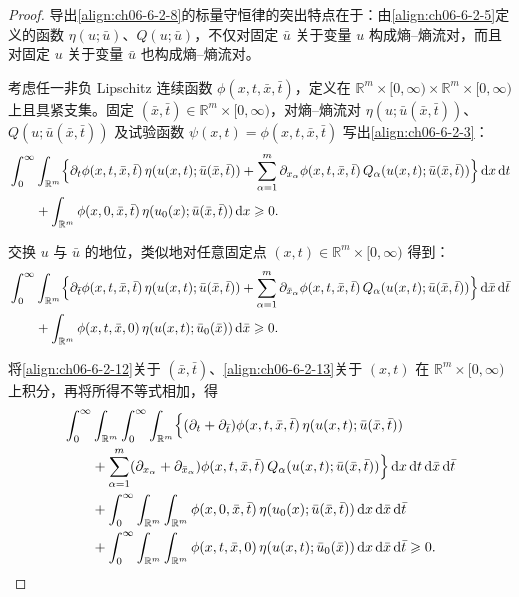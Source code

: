 \documentclass[../../main.tex]{subfiles}
\begin{document}
\begin{proof}
导出\eqref{align:ch06-6-2-8}的标量守恒律的突出特点在于：由\eqref{align:ch06-6-2-5}定义的函数 $\eta(u;\bar{u})$、$Q(u;\bar{u})$，不仅对固定 $\bar{u}$ 关于变量 $u$ 构成熵--熵流对，而且对固定 $u$ 关于变量 $\bar{u}$ 也构成熵--熵流对。

考虑任一非负 Lipschitz 连续函数 $\phi(x,t,\bar{x},\bar{t})$，定义在 $\mathbb{R}^{m}\times[0,\infty)\times\mathbb{R}^{m}\times[0,\infty)$ 上且具紧支集。固定 $(\bar{x},\bar{t})\in\mathbb{R}^{m}\times[0,\infty)$，对熵--熵流对 $\eta(u;\bar{u}(\bar{x},\bar{t}))$、$Q(u;\bar{u}(\bar{x},\bar{t}))$ 及试验函数 $\psi(x,t)=\phi(x,t,\bar{x},\bar{t})$ 写出\eqref{align:ch06-6-2-3}：
\begin{align}
&\int_{0}^{\infty}\int_{\mathbb{R}^{m}}\Bigl{\{}\partial_{t}\phi(x,t,\bar{x},\bar{t})\,\eta(u(x,t);\bar{u}(\bar{x},\bar{t}))+\sum_{\alpha=1}^{m}\partial_{x_{\alpha}}\phi(x,t,\bar{x},\bar{t})\,Q_{\alpha}(u(x,t);\bar{u}(\bar{x},\bar{t}))\Bigr{\}}\,\mathrm{d}x\,\mathrm{d}t\notag\\
&\qquad+\int_{\mathbb{R}^{m}}\phi(x,0,\bar{x},\bar{t})\,\eta(u_{0}(x);\bar{u}(\bar{x},\bar{t}))\,\mathrm{d}x\geqslant 0.
\label{align:ch06-6-2-12}
\end{align}

交换 $u$ 与 $\bar{u}$ 的地位，类似地对任意固定点 $(x,t)\in\mathbb{R}^{m}\times[0,\infty)$ 得到：
\begin{align}
&\int_{0}^{\infty}\int_{\mathbb{R}^{m}}\Bigl{\{}\partial_{\bar{t}}\phi(x,t,\bar{x},\bar{t})\,\eta(u(x,t);\bar{u}(\bar{x},\bar{t}))+\sum_{\alpha=1}^{m}\partial_{\bar{x}_{\alpha}}\phi(x,t,\bar{x},\bar{t})\,Q_{\alpha}(u(x,t);\bar{u}(\bar{x},\bar{t}))\Bigr{\}}\,\mathrm{d}\bar{x}\,\mathrm{d}\bar{t}\notag\\
&\qquad+\int_{\mathbb{R}^{m}}\phi(x,t,\bar{x},0)\,\eta(u(x,t);\bar{u}_{0}(\bar{x}))\,\mathrm{d}\bar{x}\geqslant 0.
\label{align:ch06-6-2-13}
\end{align}

将\eqref{align:ch06-6-2-12}关于 $(\bar{x},\bar{t})$、\eqref{align:ch06-6-2-13}关于 $(x,t)$ 在 $\mathbb{R}^{m}\times[0,\infty)$ 上积分，再将所得不等式相加，得
\begin{align}
&\int_{0}^{\infty}\int_{\mathbb{R}^{m}}\int_{0}^{\infty}\int_{\mathbb{R}^{m}}\Bigl{\{}(\partial_{t}+\partial_{\bar{t}})\phi(x,t,\bar{x},\bar{t})\,\eta(u(x,t);\bar{u}(\bar{x},\bar{t}))\notag\\
&\qquad+\sum_{\alpha=1}^{m}(\partial_{x_{\alpha}}+\partial_{\bar{x}_{\alpha}})\phi(x,t,\bar{x},\bar{t})\,Q_{\alpha}(u(x,t);\bar{u}(\bar{x},\bar{t}))\Bigr{\}}\,\mathrm{d}x\,\mathrm{d}t\,\mathrm{d}\bar{x}\,\mathrm{d}\bar{t}\notag\\
&\qquad+\int_{0}^{\infty}\int_{\mathbb{R}^{m}}\int_{\mathbb{R}^{m}}\phi(x,0,\bar{x},\bar{t})\,\eta(u_{0}(x);\bar{u}(\bar{x},\bar{t}))\,\mathrm{d}x\,\mathrm{d}\bar{x}\,\mathrm{d}\bar{t}\notag\\
&\qquad+\int_{0}^{\infty}\int_{\mathbb{R}^{m}}\int_{\mathbb{R}^{m}}\phi(x,t,\bar{x},0)\,\eta(u(x,t);\bar{u}_{0}(\bar{x}))\,\mathrm{d}x\,\mathrm{d}\bar{x}\,\mathrm{d}\bar{t}\geqslant 0.
\label{align:ch06-6-2-14}
\end{align}


\end{proof}
\end{document}
